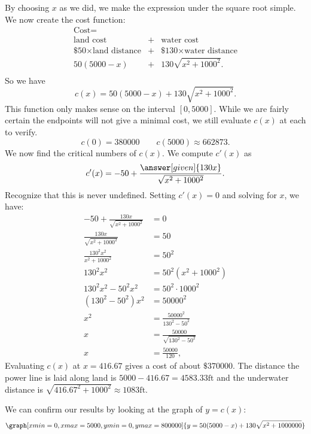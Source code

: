 \documentclass{ximera}
\begin{document}
\begin{example}
\begin{explanation}
\begin{image}
      \end{image}
      By choosing $x$ as we did, we make the expression under the
      square root simple. We now create the cost function:
    \[
    \begin{array}{ccc}
      \text{Cost} = & & \\
      \text{land cost} & + & \text{water cost} \\
      \text{\$50}\times \text{land distance} &+& \text{\$130}\times \text{water distance} \\
      50(5000-x) &+& 130\sqrt{x^2+1000^2}.\\
    \end{array}
    \]
    So we have
    \[
    c(x) = 50(5000-x)+ 130\sqrt{x^2+1000^2}.
    \]
    This function only makes sense on the interval $[0,5000]$. While
    we are fairly certain the endpoints will not give a minimal cost,
    we still evaluate $c(x)$ at each to verify.
    \[
    c(0) = 380000 \quad\quad c(5000) \approx 662873.
    \]
    We now find the critical numbers of $c(x)$. We compute $c'(x)$ as
    \[
    c'(x) = -50+\frac{\answer[given]{130x}}{\sqrt{x^2+1000^2}}.
    \]
    Recognize that this is never undefined. Setting $c'(x)=0$ and solving
    for $x$, we have:
    \begin{align*}
      -50+\frac{130x}{\sqrt{x^2+1000^2}} &= 0 \\
      \frac{130x}{\sqrt{x^2+1000^2}}  &= 50\\
      \frac{130^2x^2}{x^2+1000^2} &= 50^2\\
      130^2x^2 &= 50^2(x^2+1000^2) \\
      130^2x^2-50^2x^2 &= 50^2\cdot1000^2\\
      (130^2-50^2)x^2 &= 50000^2\\
      x^2 &= \frac{50000^2}{130^2-50^2}\\
      x &= \frac{50000}{\sqrt{130^2-50^2}}\\
      x &= \frac{50000}{120},
    \end{align*}
    Evaluating $c(x)$ at $x=416.67$ gives a cost of about
    $\$370000$. The distance the power line is laid along land is
    $5000-416.67 = 4583.33\mathrm{ft}$ and the underwater distance is
    $\sqrt{416.67^2+1000^2} \approx 1083\mathrm{ft}$.
  \begin{onlineOnly}
  We can confirm our results by looking at the graph of $y=c(x)$: 
  \[
  \graph[xmin=0, xmax=5000, ymin=0, ymax=800000]{y=50(5000-x)+130\sqrt{x^2+1000000}}
  \]
  \end{onlineOnly}
  \end{explanation}
\end{example}
\end{document}
